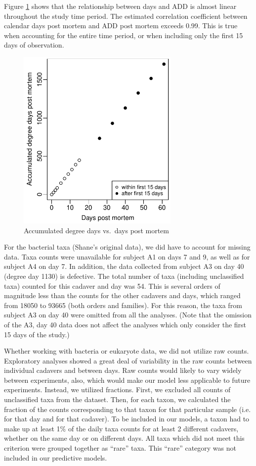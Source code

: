 \documentclass{article}
\begin{document}
Figure \ref{fig:degdays_vs_days} shows that the relationship between
days and ADD is almost linear throughout the study time period.  The
estimated correlation coefficient between calendar days post mortem
and ADD post mortem exceeds 0.99.  This is true when accounting for
the entire time period, or when including only the first 15 days of
observation.
\begin{figure}[hb]
  \centering
  \includegraphics[height=3.5in]{degdays_vs_days}
  \caption{Accumulated degree days vs.~days post mortem}
  \label{fig:degdays_vs_days}
\end{figure}

For the bacterial taxa (Shane's original data), we did have to account
for missing data.  Taxa counts were unavailable for
subject A1 on days 7 and 9, as well as for subject A4 on day 7.  In
addition, the data collected from subject A3 on day 40 (degree day
1130) is defective.  The total number of taxa (including unclassified
taxa) counted for this cadaver and day was 54.  This is several orders
of magnitude less than the counts for the other cadavers and days,
which ranged from 18050 to 93665 (both orders and families).  For this
reason, the taxa from subject A3 on day 40 were omitted from all the
analyses.  (Note that the omission of the A3, day 40 data does not
affect the analyses which only consider the first 15 days of the
study.)

Whether working with bacteria or eukaryote data, we did not utilize
raw counts.  Exploratory analyses showed a great deal of variability
in the raw counts between individual cadavers and between days.  Raw
counts would likely to vary widely between experiments, also, which
would make our model less applicable to future experiments.  Instead,
we utilized fractions.  First, we excluded all counts of unclassified
taxa from the dataset.  Then, for each taxon, we calculated the
fraction of the counts corresponding to that taxon for that particular
sample (i.e. for that day and for that cadaver).  To be included in
our models, a taxon had to make up at least 1\% of the daily taxa
counts for at least 2 different cadavers, whether on the same day or
on different days.  All taxa which did not meet this criterion were
grouped together as ``rare'' taxa.  This ``rare'' category was not
included in our predictive models.
\end{document}
